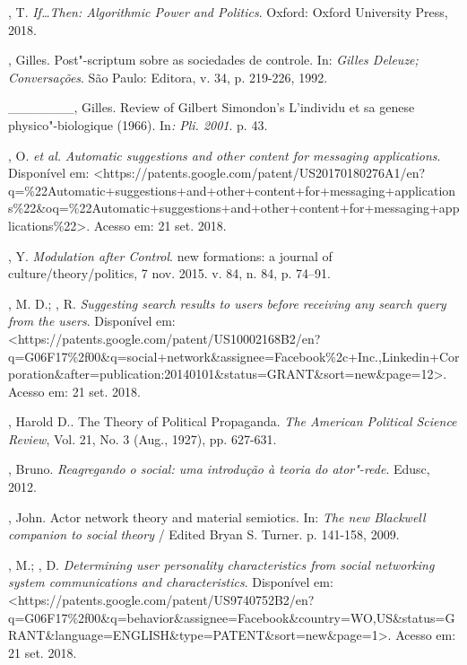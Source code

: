 \begin{Parskip}
, T. \emph{If\ldots{}Then: Algorithmic Power and Politics}. Oxford:
Oxford University Press, 2018.

, Gilles. Post"-scriptum sobre as sociedades de controle. In:
\emph{Gilles Deleuze; Conversações}. São Paulo: Editora, v. 34, p.
219-226, 1992.

\_\_\_\_\_\_\_, Gilles. Review of Gilbert Simondon's L'individu et sa
genese physico"-biologique (1966). In\emph{: Pli. 2001}. p. 43.

, O. \emph{et al.} \emph{Automatic suggestions and other
content for messaging applications}. Disponível em:
\textless{}https://patents.google.com/patent/US20170180276A1/en?q=\%22Automatic+suggestions+and+other+content+for+messaging+applications\%22\&oq=\%22Automatic+suggestions+and+other+content+for+messaging+applications\%22\textgreater{}.
Acesso em: 21 set. 2018.

, Y. \emph{Modulation after Control}. new formations: a journal of
culture/theory/politics, 7 nov. 2015. v. 84, n. 84, p. 74--91.

, M. D.; , R. \emph{Suggesting search results to users
before receiving any search query from the users}. Disponível em:
\textless{}https://patents.google.com/patent/US10002168B2/en?q=G06F17\%2f00\&q=social+network\&assignee=Facebook\%2c+Inc.,Linkedin+Corporation\&after=publication:20140101\&status=GRANT\&sort=new\&page=12\textgreater{}.
Acesso em: 21 set. 2018.

, Harold D.. The Theory of Political Propaganda. \emph{The
American Political Science Review}, Vol. 21, No. 3 (Aug., 1927), pp.
627-631.

, Bruno. \emph{Reagregando o social: uma introdução à teoria do
ator"-rede}. Edusc, 2012.

, John. Actor network theory and material semiotics. In: \emph{The
new Blackwell companion to social theory} / Edited Bryan S. Turner. p.
141-158, 2009.

, M.; , D. \emph{Determining user personality
characteristics from social networking system communications and
characteristics}. Disponível em:
\textless{}https://patents.google.com/patent/US9740752B2/en?q=G06F17\%2f00\&q=behavior\&assignee=Facebook\&country=WO,US\&status=GRANT\&language=ENGLISH\&type=PATENT\&sort=new\&page=1\textgreater{}.
Acesso em: 21 set. 2018.


\end{Parskip}
